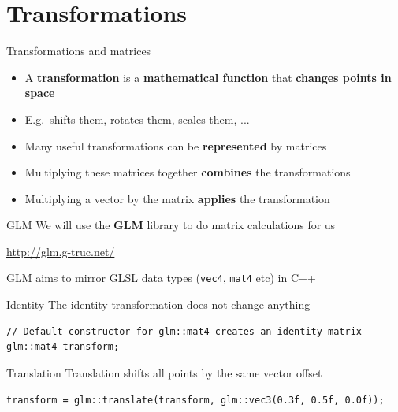 \part{Transformations}
\frame{\partpage}

\begin{frame}{Transformations and matrices}
	\begin{itemize}
		\pause\item A \textbf{transformation} is a \textbf{mathematical function} that \textbf{changes points in space}
		\pause\item E.g.\ shifts them, rotates them, scales them, ...
		\pause\item Many useful transformations can be \textbf{represented} by matrices
		\pause\item Multiplying these matrices together \textbf{combines} the transformations
		\pause\item Multiplying a vector by the matrix \textbf{applies} the transformation
	\end{itemize}
\end{frame}

\begin{frame}{GLM}
	We will use the \textbf{GLM} library to do matrix calculations for us
	
	\vspace{2ex}

	\begin{center}
		\url{http://glm.g-truc.net/}
	\end{center}

	\vspace{2ex}

	GLM aims to mirror GLSL data types (\lstinline{vec4}, \lstinline{mat4} etc) in C++
\end{frame}

\begin{frame}[fragile]{Identity}
	\pause The identity transformation does not change anything
	\pause \begin{lstlisting}
// Default constructor for glm::mat4 creates an identity matrix
glm::mat4 transform;
	\end{lstlisting}
\end{frame}

\begin{frame}[fragile]{Translation}
	\pause Translation shifts all points by the same vector offset
	\pause \begin{lstlisting}
transform = glm::translate(transform, glm::vec3(0.3f, 0.5f, 0.0f));
	\end{lstlisting}
\end{frame}

